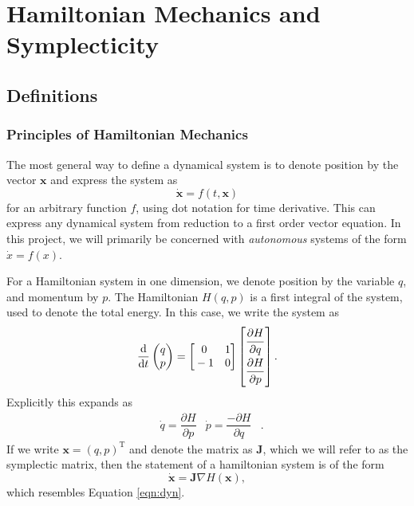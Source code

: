 \documentclass{report}
\theoremstyle{exampstyle} \newtheorem{example}[theorem]{Example}
\theoremstyle{exampstyle} \newtheorem{remark}[theorem]{Remark}
\theoremstyle{exampstyle} \newtheorem{definition}[theorem]{Definition}
\theoremstyle{exampstyle} \newtheorem{lemma}[theorem]{Lemma}
\begin{document}
\chapter{Hamiltonian Mechanics and Symplecticity}

\section{Definitions}

\subsection{Principles of Hamiltonian Mechanics}

The most general way to define a dynamical system is to denote position by the vector $\mathbf{x}$ and express the system as
\begin{equation}
	\mathbf{\dot{x}} = f(t,\mathbf{x})
	\label{eqn:dyn}
\end{equation}
for an arbitrary function $f$, using dot notation for time derivative.
This can express any dynamical system from reduction to a first order vector equation.
In this project, we will primarily be concerned with \textit{autonomous} systems of the form $\dot{x} = f(x)$.

For a Hamiltonian system in one dimension, we denote position by the variable $q$, and momentum by $p$.
The Hamiltonian $H(q,p)$ is a first integral of the system, used to denote the total energy.
In this case, we write the system as
\begin{equation}
	\dfrac{\mathrm{d}}{\mathrm{d}t}\begin{pmatrix}
		q \\
		p
	\end{pmatrix} = \begin{bmatrix}
		\strut 0 & \strut 1 \\
		\strut -1 & \strut 0
	\end{bmatrix}\begin{bmatrix}
	\dfrac{\strut \partial H}{\strut\partial q} \\
	\dfrac{\strut \partial H}{\strut\partial p}
	\end{bmatrix}.
\end{equation}
Explicitly this expands as
\begin{align*}
	&\dot{q} = \dfrac{\partial H}{\partial p}
	&
	\dot{p} = \dfrac{-\partial H}{\partial q}&.	
\end{align*}
If we write $\mathbf{x} = (q,p)^\mathrm{T}$ and denote the matrix as $\mathbf{J}$, which we will refer to as the symplectic matrix,
then the statement of a hamiltonian system is of the form 
\begin{equation}
	\mathbf{\dot{x}} = \mathbf{J}\nabla H(\mathbf{x}),
	\label{eqn:hdyn}
\end{equation}
which resembles Equation \ref{eqn:dyn}.
\end{document}
